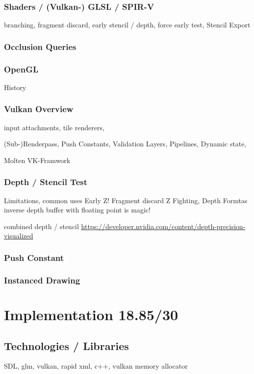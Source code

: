 \subsubsection{Shaders / (Vulkan-) GLSL / SPIR-V}
branching, fragment discard, early stencil / depth, force early test, Stencil Export

\subsubsection{Occlusion Queries}

\subsubsection{OpenGL}
History


\subsubsection{Vulkan Overview}
input attachments, tile renderers,

(Sub-)Renderpass, Push Constants, Validation Layers, Pipelines, Dynamic state,

Molten VK-Framwork

\subsubsection{Depth / Stencil Test}
Limitations, common uses
Early Z! Fragment discard
Z Fighting,
Depth Formtas
inverse depth buffer with floating point is magic!

combined depth / stencil
\url{https://developer.nvidia.com/content/depth-precision-visualized}

\subsubsection{Push Constant}

\subsubsection{Instanced Drawing}

\section{Implementation 18.85/30}

\subsection{Technologies / Libraries}
SDL, glm, vulkan, rapid xml, c++, vulkan memory allocator

